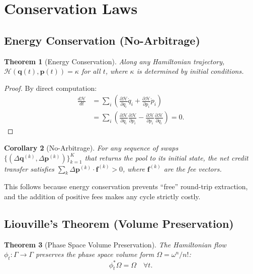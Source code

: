 \documentclass[11pt,twocolumn]{article}
\newtheorem{theorem}{Theorem}
\newtheorem{corollary}[theorem]{Corollary}
\begin{document}
\section{Conservation Laws}
\label{sec:conservation}

\subsection{Energy Conservation (No-Arbitrage)}

\begin{theorem}[Energy Conservation]
\label{thm:energy}
Along any Hamiltonian trajectory, $\mathcal{H}(\bm{q}(t), \bm{p}(t)) = \kappa$ for all $t$, where $\kappa$ is determined by initial conditions.
\end{theorem}

\begin{proof}
By direct computation:
\begin{align}
\frac{d\mathcal{H}}{dt} &= \sum_i \left(\frac{\partial \mathcal{H}}{\partial q_i}\dot{q}_i + \frac{\partial \mathcal{H}}{\partial p_i}\dot{p}_i\right) \\
&= \sum_i \left(\frac{\partial \mathcal{H}}{\partial q_i}\frac{\partial \mathcal{H}}{\partial p_i} - \frac{\partial \mathcal{H}}{\partial p_i}\frac{\partial \mathcal{H}}{\partial q_i}\right) = 0.
\end{align}
\end{proof}

\begin{corollary}[No-Arbitrage]
For any sequence of swaps $\{(\Delta\bm{q}^{(k)}, \Delta\bm{p}^{(k)})\}_{k=1}^K$ that returns the pool to its initial state, the net credit transfer satisfies $\sum_k \Delta\bm{p}^{(k)} \cdot \bm{f}^{(k)} > 0$, where $\bm{f}^{(k)}$ are the fee vectors.
\end{corollary}

This follows because energy conservation prevents ``free'' round-trip extraction, and the addition of positive fees makes any cycle strictly costly.

\subsection{Liouville's Theorem (Volume Preservation)}

\begin{theorem}[Phase Space Volume Preservation]
\label{thm:liouville}
The Hamiltonian flow $\phi_t : \Gamma \to \Gamma$ preserves the phase space volume form $\Omega = \omega^n / n!$:
\begin{equation}
\phi_t^* \Omega = \Omega \quad \forall t.
\end{equation}
\end{theorem}
\end{document}
